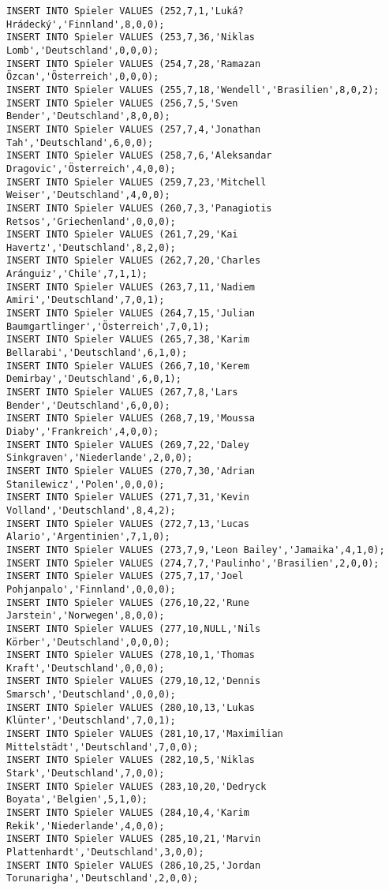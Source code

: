 \documentclass{bschlangaul-aufgabe}
\begin{document}
\begin{verbatim}
INSERT INTO Spieler VALUES (252,7,1,'Luká? Hrádecký','Finnland',8,0,0);
INSERT INTO Spieler VALUES (253,7,36,'Niklas Lomb','Deutschland',0,0,0);
INSERT INTO Spieler VALUES (254,7,28,'Ramazan Özcan','Österreich',0,0,0);
INSERT INTO Spieler VALUES (255,7,18,'Wendell','Brasilien',8,0,2);
INSERT INTO Spieler VALUES (256,7,5,'Sven Bender','Deutschland',8,0,0);
INSERT INTO Spieler VALUES (257,7,4,'Jonathan Tah','Deutschland',6,0,0);
INSERT INTO Spieler VALUES (258,7,6,'Aleksandar Dragovic','Österreich',4,0,0);
INSERT INTO Spieler VALUES (259,7,23,'Mitchell Weiser','Deutschland',4,0,0);
INSERT INTO Spieler VALUES (260,7,3,'Panagiotis Retsos','Griechenland',0,0,0);
INSERT INTO Spieler VALUES (261,7,29,'Kai Havertz','Deutschland',8,2,0);
INSERT INTO Spieler VALUES (262,7,20,'Charles Aránguiz','Chile',7,1,1);
INSERT INTO Spieler VALUES (263,7,11,'Nadiem Amiri','Deutschland',7,0,1);
INSERT INTO Spieler VALUES (264,7,15,'Julian Baumgartlinger','Österreich',7,0,1);
INSERT INTO Spieler VALUES (265,7,38,'Karim Bellarabi','Deutschland',6,1,0);
INSERT INTO Spieler VALUES (266,7,10,'Kerem Demirbay','Deutschland',6,0,1);
INSERT INTO Spieler VALUES (267,7,8,'Lars Bender','Deutschland',6,0,0);
INSERT INTO Spieler VALUES (268,7,19,'Moussa Diaby','Frankreich',4,0,0);
INSERT INTO Spieler VALUES (269,7,22,'Daley Sinkgraven','Niederlande',2,0,0);
INSERT INTO Spieler VALUES (270,7,30,'Adrian Stanilewicz','Polen',0,0,0);
INSERT INTO Spieler VALUES (271,7,31,'Kevin Volland','Deutschland',8,4,2);
INSERT INTO Spieler VALUES (272,7,13,'Lucas Alario','Argentinien',7,1,0);
INSERT INTO Spieler VALUES (273,7,9,'Leon Bailey','Jamaika',4,1,0);
INSERT INTO Spieler VALUES (274,7,7,'Paulinho','Brasilien',2,0,0);
INSERT INTO Spieler VALUES (275,7,17,'Joel Pohjanpalo','Finnland',0,0,0);
INSERT INTO Spieler VALUES (276,10,22,'Rune Jarstein','Norwegen',8,0,0);
INSERT INTO Spieler VALUES (277,10,NULL,'Nils Körber','Deutschland',0,0,0);
INSERT INTO Spieler VALUES (278,10,1,'Thomas Kraft','Deutschland',0,0,0);
INSERT INTO Spieler VALUES (279,10,12,'Dennis Smarsch','Deutschland',0,0,0);
INSERT INTO Spieler VALUES (280,10,13,'Lukas Klünter','Deutschland',7,0,1);
INSERT INTO Spieler VALUES (281,10,17,'Maximilian Mittelstädt','Deutschland',7,0,0);
INSERT INTO Spieler VALUES (282,10,5,'Niklas Stark','Deutschland',7,0,0);
INSERT INTO Spieler VALUES (283,10,20,'Dedryck Boyata','Belgien',5,1,0);
INSERT INTO Spieler VALUES (284,10,4,'Karim Rekik','Niederlande',4,0,0);
INSERT INTO Spieler VALUES (285,10,21,'Marvin Plattenhardt','Deutschland',3,0,0);
INSERT INTO Spieler VALUES (286,10,25,'Jordan Torunarigha','Deutschland',2,0,0);

\end{verbatim}
\end{document}
